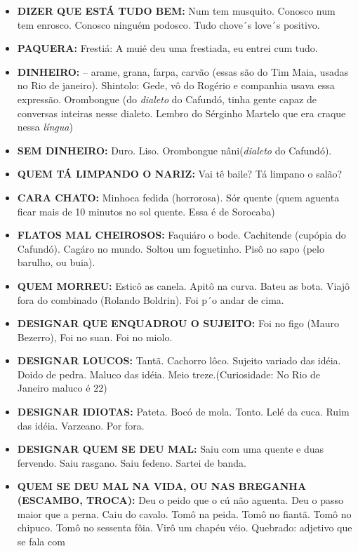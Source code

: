 \documentclass[12pt,brazil,]{book}
\providecommand{\tightlist}{%
  \setlength{\itemsep}{0pt}\setlength{\parskip}{0pt}}
\begin{document}
\begin{itemize}
\tightlist
\item
  \textbf{DIZER QUE ESTÁ TUDO BEM:} Num tem musquito. Conosco num tem
  enrosco. Conosco ninguém podosco. Tudo chove´s love´s positivo.
\item
  \textbf{PAQUERA:} Frestiá: A muié deu uma frestiada, eu entrei cum
  tudo.
\item
  \textbf{DINHEIRO:} -- arame, grana, farpa, carvão (essas são do Tim
  Maia, usadas no Rio de janeiro). Shintolo: Gede, vô do Rogério e
  companhia usava essa expressão. Orombongue (do \emph{dialeto} do
  Cafundó, tinha gente capaz de conversas inteiras nesse dialeto. Lembro
  do Sérginho Martelo que era craque nessa \emph{língua})
\item
  \textbf{SEM DINHEIRO:} Duro. Liso. Orombongue nâni(\emph{dialeto} do
  Cafundó).
\item
  \textbf{QUEM TÁ LIMPANDO O NARIZ:} Vai tê baile? Tá limpano o salão?
\item
  \textbf{CARA CHATO:} Minhoca fedida (horrorosa). Sór quente (quem
  aguenta ficar mais de 10 minutos no sol quente. Essa é de Sorocaba)\\
\item
  \textbf{FLATOS MAL CHEIROSOS:} Faquiáro o bode. Cachitende (cupópia do
  Cafundó). Cagáro no mundo. Soltou um foguetinho. Pisô no sapo (pelo
  barulho, ou buia).
\item
  \textbf{QUEM MORREU:} Esticô as canela. Apitô na curva. Bateu as bota.
  Viajô fora do combinado (Rolando Boldrin). Foi p´o andar de cima.
\item
  \textbf{DESIGNAR QUE ENQUADROU O SUJEITO:} Foi no figo (Mauro
  Bezerro), Foi no suan. Foi no miolo.
\item
  \textbf{DESIGNAR LOUCOS:} Tantã. Cachorro lôco. Sujeito variado das
  idéia. Doido de pedra. Maluco das idéia. Meio treze.(Curiosidade: No
  Rio de Janeiro maluco é 22)
\item
  \textbf{DESIGNAR IDIOTAS:} Pateta. Bocó de mola. Tonto. Lelé da cuca.
  Ruim das idéia. Varzeano. Por fora.
\item
  \textbf{DESIGNAR QUEM SE DEU MAL:} Saiu com uma quente e duas
  fervendo. Saiu rasgano. Saiu fedeno. Sartei de banda.
\item
  \textbf{QUEM SE DEU MAL NA VIDA, OU NAS BREGANHA (ESCAMBO, TROCA):}
  Deu o peido que o cú não aguenta. Deu o passo maior que a perna. Caiu
  do cavalo. Tomô na peida. Tomô no fiantã. Tomô no chipuco. Tomô no
  sessenta fôia. Virô um chapéu véio. Quebrado: adjetivo que se fala com

\end{itemize}
\end{document}

